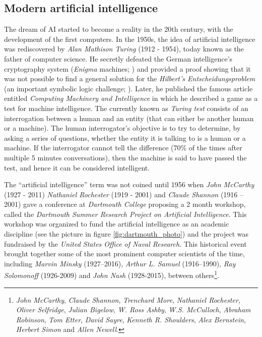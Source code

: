 \subsection{Modern artificial intelligence}
The dream of AI started to become a reality in the 20th century, with the development of the first computers. In the 1950s, the idea of artificial intelligence was rediscovered by \textit{Alan Mathison Turing} (1912 - 1954), today known as the father of computer science. He secretly defeated the German intelligence's cryptography system (\textit{Enigma} machines; \citealp{Hodges:2000}) and provided a proof showing that it was not possible to find a general solution for the \textit{Hilbert's Entscheidungsproblem} (an important symbolic logic challenge; \citealp{turing1936}). Later, he published the famous article entitled \textit{Computing Machinery and Intelligence} \autocite{turing1950} in which he described a game as a test for machine intelligence. The currently known as \textit{Turing test} consists of an interrogation between a human and an entity (that can either be another human or a machine). The human interrogator's objective is to try to determine, by asking a series of questions, whether the entity it is talking to is a human or a machine. If the interrogator cannot tell the difference (70\% of the times after multiple 5 minutes conversations), then the machine is said to have passed the test, and hence it can be considered intelligent.


The ``artificial intelligence'' term was not coined until 1956 when \textit{John McCarthy} (1927 - 2011) \textit{Nathaniel Rochester} (1919 - 2001) and \textit{Claude Shannon} (1916 – 2001) gave a conference at \textit{Dartmouth College} proposing a 2 month workshop, called the \textit{Dartmouth Summer Research Project on Artificial Intelligence}. This workshop was organized to fund the artificial intelligence as an academic discipline (see the picture in figure \ref{fig:dartmouth_photo}) and the project was fundraised by the \textit{United States Office of Naval Research}. This historical event brought together some of the most prominent computer scientists of the time, including \textit{Marvin Minsky} (1927–2016), \textit{Arthur L. Samuel} (1916–1990), \textit{Ray Solomonoff} (1926-2009) and  \textit{John Nash} (1928-2015), between others\footnote{\textit{John McCarthy}, \textit{Claude Shannon}, \textit{Trenchard More}, \textit{Nathaniel Rochester}, \textit{Oliver Selfridge}, \textit{Julian Bigelow}, \textit{W. Ross Ashby}, \textit{W.S. McCulloch}, \textit{Abraham Robinson}, \textit{Tom Etter},  \textit{David Sayre}, \textit{Kenneth R. Shoulders}, \textit{Alex Bernstein}, \textit{Herbert Simon} and \textit{Allen Newell}.}.

